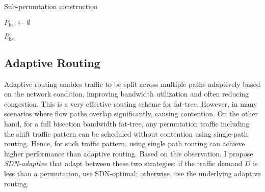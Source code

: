 \begin{algorithm}[H]
\caption{Sub-permutation construction}
\label{alg:sub_permutation}

$P_{\text{list}} \gets \emptyset$\;


\Return $P_{\text{list}}$\;
\end{algorithm}

\subsection{Adaptive Routing}

Adaptive routing enables traffic to be split across multiple paths adaptively
based on the network condition, improving bandwidth utilization and often
reducing congestion. This is a very effective routing scheme for fat-tree.
However, in many scenarios where flow paths overlap significantly, causing
contention. On the other hand, for a full bisection bandwidth fat-tree, any
permutation traffic including the shift traffic pattern can be scheduled
without contention using single-path routing. Hence, for such traffic pattern,
using single path routing can achieve higher performance than
adaptive routing. Based on this observation, I propose \textit{SDN-adaptive}
that adapt between these two strategies: if the traffic demand $D$ is
less than a permutation, use SDN-optimal; otherwise, use the underlying
adaptive routing.

